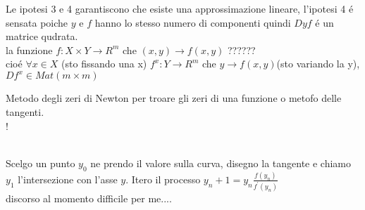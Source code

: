 \observation
Le ipotesi 3 e 4 garantiscono che esiste una approssimazione lineare, l'ipotesi 4 \'e sensata poiche $y$ e $f$ hanno lo stesso numero di componenti quindi $Dyf$ \'e un matrice qudrata.\\
la funzione $f:X\times Y\rightarrow R^m$ che $(x,y)\rightarrow f(x,y)$ ??????\\
cio\'e $\forall x\in X$ (sto fissando una x) $f^x:Y\rightarrow R^m$ che $y\rightarrow f(x,y)$(sto variando la y), $Df^x\in Mat(m\times m)$

\observation Metodo degli zeri di Newton per troare gli zeri di una funzione o metofo delle tangenti.\\
\resizebox {\columnwidth} {!} {
}\\
Scelgo un punto $y_0$ ne prendo il valore sulla curva, disegno la tangente e chiamo $y_1$ l'intersezione con l'asse $y$. Itero il processo $y_n+1=y_n\frac{f(y_n)}{f^{'}(y_n)}$\\
discorso al momento difficile per me....\\
